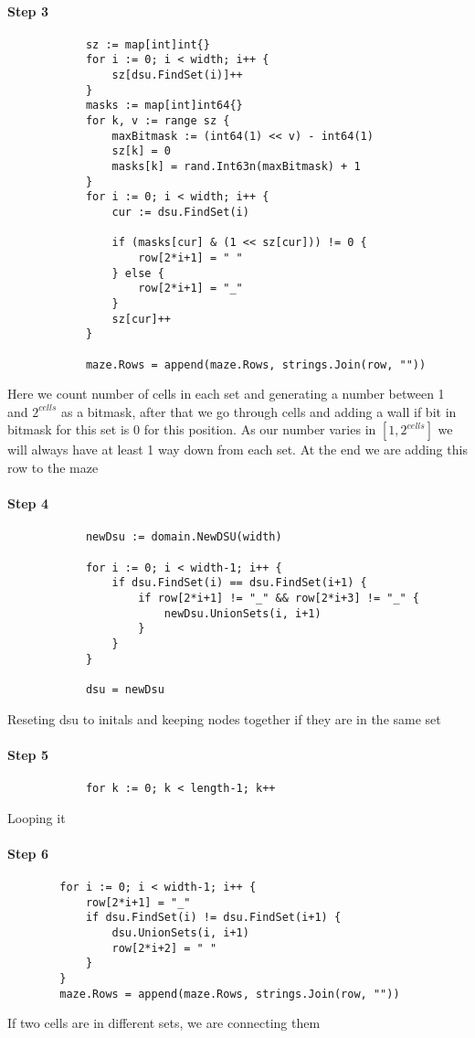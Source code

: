 		\paragraph{Step 3}
		\begin{lstlisting}
			sz := map[int]int{}
			for i := 0; i < width; i++ {
				sz[dsu.FindSet(i)]++
			}
			masks := map[int]int64{}
			for k, v := range sz {
				maxBitmask := (int64(1) << v) - int64(1)
				sz[k] = 0
				masks[k] = rand.Int63n(maxBitmask) + 1
			}
			for i := 0; i < width; i++ {
				cur := dsu.FindSet(i)

				if (masks[cur] & (1 << sz[cur])) != 0 {
					row[2*i+1] = " "
				} else {
					row[2*i+1] = "_"
				}
				sz[cur]++
			}
			
			maze.Rows = append(maze.Rows, strings.Join(row, ""))
		\end{lstlisting}
		Here we count number of cells in each set and generating a number between 1 and $2^{cells}$
		as a bitmask, after that we go through cells and adding a wall if bit in bitmask for this set is 0 for this position. As our number varies in $[1,2^{cells}]$ we will always have at least 1 way down from each set. At the end we are adding this row to the maze
		
		\paragraph{Step 4}
		\begin{lstlisting}
			newDsu := domain.NewDSU(width)

			for i := 0; i < width-1; i++ {
				if dsu.FindSet(i) == dsu.FindSet(i+1) {
					if row[2*i+1] != "_" && row[2*i+3] != "_" {
						newDsu.UnionSets(i, i+1)
					}
				}
			}

			dsu = newDsu
		\end{lstlisting}
		Reseting dsu to initals and keeping nodes together if they are in the same set
		
		\paragraph{Step 5}
		\begin{lstlisting}
			for k := 0; k < length-1; k++
		\end{lstlisting}
		Looping it
		
		\paragraph{Step 6}
		\begin{lstlisting}
		for i := 0; i < width-1; i++ {
			row[2*i+1] = "_"
			if dsu.FindSet(i) != dsu.FindSet(i+1) {
				dsu.UnionSets(i, i+1)
				row[2*i+2] = " "
			}
		}	
		maze.Rows = append(maze.Rows, strings.Join(row, ""))
		\end{lstlisting}
		If two cells are in different sets, we are connecting them
		
